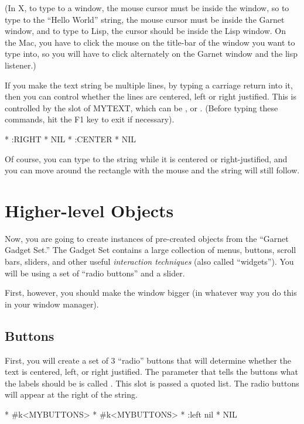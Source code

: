 (In X, to type to a window, the mouse cursor must be inside the window, so to
type to the ``Hello World'' string, the mouse cursor must be inside the Garnet
window, and to type to Lisp, the cursor should be inside the Lisp
window.  On the Mac, you have to click the mouse on the title-bar of
the window you want to type into, so you will have to click
alternately on the Garnet window and the lisp listener.)


If you make the text string be multiple lines, by typing a carriage
return into it,
then you can control whether the lines are centered, left or right
justified.  This is controlled by the  slot of
MYTEXT, which can be , or .
(Before typing these commands, hit the F1 key to exit  
if necessary).
\begin{programexample}
* 
:RIGHT
* 
NIL
* 
:CENTER
* 
NIL
\end{programexample}

Of course, you can type to the string while it is centered or
right-justified, and you can move around the rectangle with the mouse and
the string will still follow.

\section{Higher-level Objects}

Now, you are going to create instances of pre-created objects from the
``Garnet Gadget Set.''  The Gadget Set contains a large collection of menus,
buttons, scroll bars, sliders, and other useful {\it interaction techniques}
(also called ``widgets'').  You will be using a set of ``radio buttons''
and a slider.

First, however, you should make the window bigger (in whatever way you
do this in
your window manager).

\subsection{Buttons}

First, you will create a set of 3 ``radio'' buttons that will determine
whether the text
is centered, left, or right justified.  The parameter that tells the
buttons what the labels should be is called .  This slot is
passed a quoted list.  The radio buttons will appear at the right of
the string.
\begin{programexample}
* 
\#k<MYBUTTONS>
* 
\#k<MYBUTTONS>
*
:left
nil
* 
NIL
\end{programexample}

